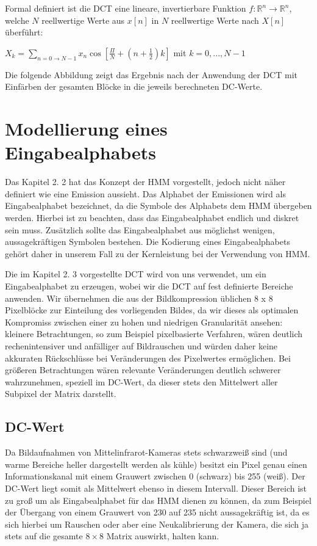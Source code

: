  Formal definiert ist die DCT eine lineare, invertierbare Funktion $f : \mathbb{R}^n \rightarrow \mathbb{R}^n$, welche $N$ reellwertige Werte aus $x[n]$ in $N$ reellwertige Werte nach $X[n]$ überführt:

 $X_k = \sum\limits_{n=0\rightarrow N-1} x_n \cos [\frac{\Pi}{N} + (n + \frac{1}{2}) k ]$ mit $k = 0,..., N-1$


Die folgende Abbildung zeigt das Ergebnis nach der Anwendung der DCT mit Einfärben der gesamten Blöcke in die jeweils berechneten DC-Werte.


\section{Modellierung eines Eingabealphabets}

Das Kapitel 2.
2 hat das Konzept der HMM vorgestellt, jedoch nicht näher definiert wie eine Emission aussieht.
 Das Alphabet der Emissionen wird als Eingabealphabet bezeichnet, da die Symbole des Alphabets dem HMM übergeben werden.
 Hierbei ist zu beachten, dass das Eingabealphabet endlich und diskret sein muss.
 Zusätzlich sollte das Eingabealphabet aus möglichst wenigen, aussagekräftigen Symbolen bestehen.
 Die Kodierung eines Eingabealphabets gehört daher in unserem Fall zu der Kernleistung bei der Verwendung von HMM.
 

Die im Kapitel 2.
3 vorgestellte DCT wird von uns verwendet, um ein Eingabealphabet zu erzeugen, wobei wir die DCT auf fest definierte Bereiche anwenden.
 Wir übernehmen die aus der Bildkompression üblichen 8 x 8 Pixelblöcke zur Einteilung des vorliegenden Bildes, da wir dieses als optimalen Kompromiss zwischen einer zu hohen und niedrigen Granularität ansehen: kleinere Betrachtungen, so zum Beispiel pixelbasierte Verfahren, wären deutlich rechenintensiver und anfälliger auf Bildrauschen und würden daher keine akkuraten Rückschlüsse bei Veränderungen des Pixelwertes ermöglichen.
 Bei größeren Betrachtungen wären relevante Veränderungen deutlich schwerer wahrzunehmen, speziell im DC-Wert, da dieser stets den Mittelwert aller Subpixel der Matrix darstellt.
 

\subsection{DC-Wert}

Da Bildaufnahmen von Mittelinfrarot-Kameras stets schwarzweiß sind (und warme Bereiche heller dargestellt werden als kühle) besitzt ein Pixel genau einen Informationskanal mit einem Grauwert zwischen 0 (schwarz) bis 255 (weiß).
 Der DC-Wert liegt somit als Mittelwert ebenso in diesem Intervall.
 Dieser Bereich ist zu groß um als Eingabealphabet für das HMM dienen zu können, da zum Beispiel der Übergang von einem Grauwert von 230 auf 235 nicht aussagekräftig ist, da es sich hierbei um Rauschen oder aber eine Neukalibrierung der Kamera, die sich ja stets auf die gesamte $8 \times 8$ Matrix auswirkt, halten kann.
 

